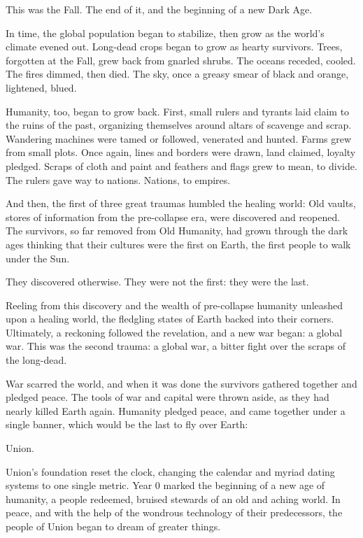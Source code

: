 This was the Fall. The end of it, and the beginning of a new Dark Age.


In time, the global population began to stabilize, then grow as the world’s climate evened out.
Long-dead crops began to grow as hearty survivors. Trees, forgotten at the Fall, grew back from
gnarled shrubs. The oceans receded, cooled. The fires dimmed, then died. The sky, once a
greasy smear of black and orange, lightened, blued.


Humanity, too, began to grow back. First, small rulers and tyrants laid claim to the ruins of the
past, organizing themselves around altars of scavenge and scrap. Wandering machines were
tamed or followed, venerated and hunted. Farms grew from small plots. Once again, lines and
borders were drawn, land claimed, loyalty pledged. Scraps of cloth and paint and feathers and
flags grew to mean, to divide. The rulers gave way to nations. Nations, to empires.


And then, the first of three great traumas humbled the healing world: Old vaults, stores of
information from the pre-collapse era, were discovered and reopened. The survivors, so far
removed from Old Humanity, had grown through the dark ages thinking that their cultures were
the first on Earth, the first people to walk under the Sun.


They discovered otherwise. They were not the first: they were the last.


Reeling from this discovery and the wealth of pre-collapse humanity unleashed upon a healing
world, the fledgling states of Earth backed into their corners. Ultimately, a reckoning followed the
revelation, and a new war began: a global war. This was the second trauma: a global war, a bitter
fight over the scraps of the long-dead.


War scarred the world, and when it was done the survivors gathered together and pledged
peace. The tools of war and capital were thrown aside, as they had nearly killed Earth again.
Humanity pledged peace, and came together under a single banner, which would be the last to
fly over Earth:


Union.


Union’s foundation reset the clock, changing the calendar and myriad dating systems to one
single metric. Year 0 marked the beginning of a new age of humanity, a people redeemed,
bruised stewards of an old and aching world. In peace, and with the help of the wondrous
technology of their predecessors, the people of Union began to dream of greater things.





